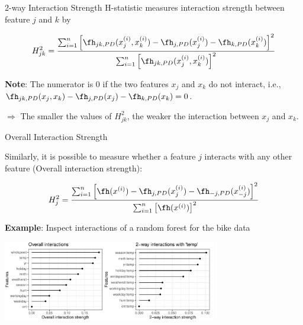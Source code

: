 \documentclass[11pt,compress,t,notes=noshow, aspectratio=169, xcolor=table]{beamer}
\begin{document}
\begin{frame}{2-way Interaction Strength}
H-statistic measures interaction strength between feature $j$ and $k$ by

	$$H^2_{jk} = \frac{\sum_{i=1}^n\left[\fh_{jk,PD}(x_j^{(i)}, x_k^{(i)}) - \fh_{j, PD}(x_j^{(i)}) - \fh_{k, PD}(x_k^{(i)})  \right]^2}{\sum_{i=1}^n \left[\fh_{jk,PD}(x_j^{(i)}, x_k^{(i)}) \right]^2}$$

\textbf{Note}: The numerator is $0$ if the two features $x_j$ and $x_k$ do not interact, i.e., $\fh_{jk, PD}(x_j, x_k) - \fh_{j, PD}(x_j) - \fh_{k, PD}(x_k) = 0$.

$\Rightarrow$ The smaller the values of $H^2_{jk}$, the weaker the interaction between $x_j$ and $x_k$.



\end{frame}


\begin{frame}{Overall Interaction Strength}

Similarly, it is possible to measure whether a feature $j$ interacts with any other feature (Overall interaction strength):


$$H^2_{j} = \frac{\sum_{i=1}^n\left[\fh(x^{(i)}) - \fh_{j, PD}(x_j^{(i)}) - \fh_{-j, PD}(x_{-j}^{(i)})  \right]^2}{\sum_{i=1}^n \left[\fh(x^{(i)}) \right]^2}$$

\textbf{Example}: Inspect interactions of a random forest for the bike data

\begin{center}
	\includegraphics[width=0.7\textwidth]{figure/h-statistic}
\end{center}
\end{frame}


\endlecture
\end{document}
